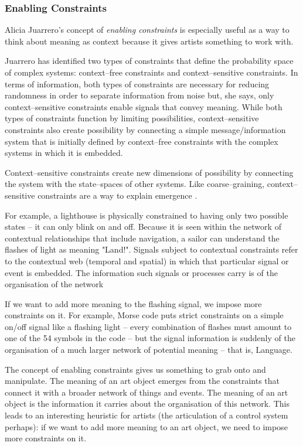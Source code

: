 \documentclass[letterpaper]{article}
\begin{document}
    \subsubsection{Enabling Constraints}

    Alicia Juarrero's concept of \emph{enabling constraints} is especially useful as a way to think about meaning as context because it gives artists something to work with.
    
    Juarrero has identified two types of constraints that define the probability space of complex systems: context–free constraints and context–sensitive constraints. In terms of information, both types of constraints are necessary for reducing randomness in order to separate information from noise but, she says, only context–sensitive constraints enable signals that convey meaning. While both types of constraints function by limiting possibilities, context–sensitive constraints also create possibility by connecting a simple message/information system that is initially defined by context–free constraints with the complex systems in which it is embedded.
    
    Context–sensitive constraints create new dimensions of possibility by connecting the system with the state–spaces of other systems. Like coarse–graining, context–sensitive constraints are a way to explain emergence \citep[p.193]{JuarreroThSlfOrgnstnOfIntntnlActn2004} \citep[p.240]{JuarreroCsltyAsCnstrnt1998}.

    For example, a lighthouse is physically constrained to having only two possible states – it can only blink on and off. Because it is seen within the network of contextual relationships that include navigation, a sailor can understand the flashes of light as meaning "Land!". Signals subject to contextual constraints refer to the contextual web (temporal and spatial) in which that particular signal or event is embedded. The information such signals or processes carry is of the organisation of the network \citep[p.237]{JuarreroCsltyAsCnstrnt1998}
    
    If we want to add more meaning to the flashing signal, we impose more constraints on it. For example, Morse code puts strict constraints on a simple on/off signal like a flashing light – every combination of flashes must amount to one of the 54 symbols in the code – but the signal information is suddenly of the organisation of a much larger network of potential meaning – that is, Language.

    The concept of enabling constraints gives us something to grab onto and manipulate. The meaning of an art object emerges from the constraints that connect it with a broader network of things and events. The meaning of an art object is the information it carries about the organisation of this network. This leads to an interesting heuristic for artists (the articulation of a control system perhaps): if we want to add more meaning to an art object, we need to impose more constraints on it.
\end{document}
